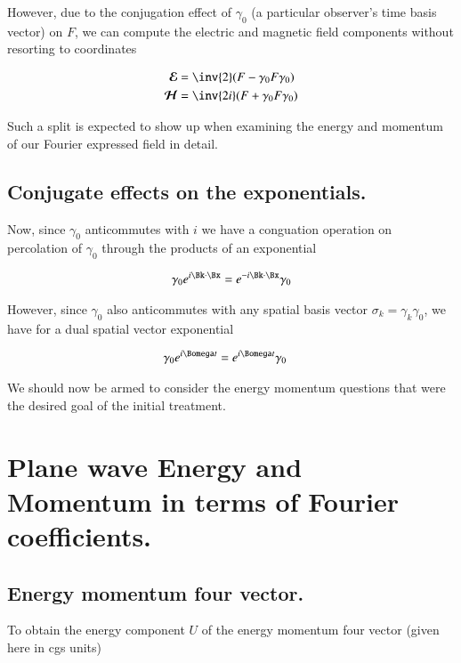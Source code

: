 \documentclass{article}
\newcommand{\EE}[0]{\boldsymbol{\mathcal{E}}}
\newcommand{\HH}[0]{\boldsymbol{\mathcal{H}}}
\begin{document}
However, due to the conjugation effect of $\gamma_0$ 
(a particular observer's time basis vector)
on $F$, 
we can compute the electric and magnetic field components without resorting to coordinates

\begin{align}
\EE &= \inv{2}(F - \gamma_0 F \gamma_0 ) \\
\HH &= \inv{2i}(F + \gamma_0 F \gamma_0 )
\end{align}

Such a split is expected to show up when examining the energy and momentum of our Fourier expressed field in detail.

\subsection{ Conjugate effects on the exponentials. }

Now, since $\gamma_0$ anticommutes with $i$ we have a conguation operation on percolation of $\gamma_0$ through the products of an exponential

\begin{align}
\gamma_0 e^{i \Bk \cdot \Bx} = e^{-i \Bk \cdot \Bx} \gamma_0 
\end{align}

However, since $\gamma_0$ also anticommutes with any spatial basis vector $\sigma_k = \gamma_k \gamma_0$, we have for a dual spatial vector exponential

\begin{align}
\gamma_0 e^{i \Bomega t} &= e^{i \Bomega t} \gamma_0
\end{align}

We should now be armed to consider the energy momentum questions that were the desired goal of the initial treatment.

\section{ Plane wave Energy and Momentum in terms of Fourier coefficients. }

\subsection{ Energy momentum four vector. }

To obtain the energy component $U$ of the energy momentum four
vector (given here in cgs units)
\end{document}
